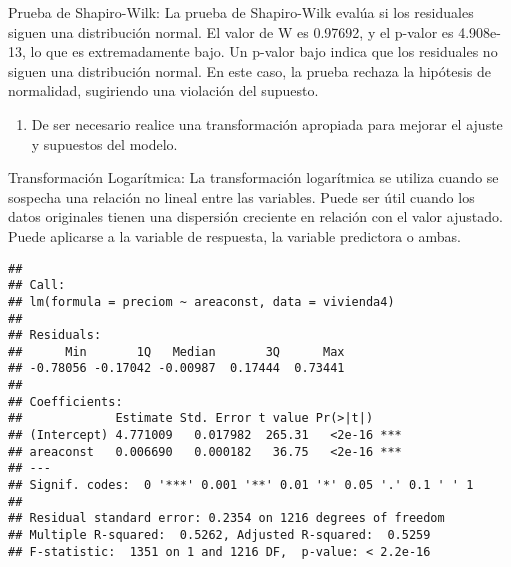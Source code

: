 \documentclass[
]{article}
\newenvironment{Shaded}{\begin{snugshade}}{\end{snugshade}}
\newcommand{\AttributeTok}[1]{\textcolor[rgb]{0.13,0.29,0.53}{#1}}
\newcommand{\CommentTok}[1]{\textcolor[rgb]{0.56,0.35,0.01}{\textit{#1}}}
\newcommand{\FunctionTok}[1]{\textcolor[rgb]{0.13,0.29,0.53}{\textbf{#1}}}
\newcommand{\NormalTok}[1]{#1}
\newcommand{\OtherTok}[1]{\textcolor[rgb]{0.56,0.35,0.01}{#1}}
\newcommand{\SpecialCharTok}[1]{\textcolor[rgb]{0.81,0.36,0.00}{\textbf{#1}}}
\providecommand{\tightlist}{%
  \setlength{\itemsep}{0pt}\setlength{\parskip}{0pt}}
\begin{document}
Prueba de Shapiro-Wilk: La prueba de Shapiro-Wilk evalúa si los
residuales siguen una distribución normal. El valor de W es 0.97692, y
el p-valor es 4.908e-13, lo que es extremadamente bajo. Un p-valor bajo
indica que los residuales no siguen una distribución normal. En este
caso, la prueba rechaza la hipótesis de normalidad, sugiriendo una
violación del supuesto.

\begin{enumerate}
\def\labelenumi{\arabic{enumi}.}
\setcounter{enumi}{7}
\tightlist
\item
  De ser necesario realice una transformación apropiada para mejorar el
  ajuste y supuestos del modelo.
\end{enumerate}

Transformación Logarítmica: La transformación logarítmica se utiliza
cuando se sospecha una relación no lineal entre las variables. Puede ser
útil cuando los datos originales tienen una dispersión creciente en
relación con el valor ajustado. Puede aplicarse a la variable de
respuesta, la variable predictora o ambas.

\begin{Shaded}
\end{Shaded}

\begin{verbatim}
## 
## Call:
## lm(formula = preciom ~ areaconst, data = vivienda4)
## 
## Residuals:
##      Min       1Q   Median       3Q      Max 
## -0.78056 -0.17042 -0.00987  0.17444  0.73441 
## 
## Coefficients:
##             Estimate Std. Error t value Pr(>|t|)    
## (Intercept) 4.771009   0.017982  265.31   <2e-16 ***
## areaconst   0.006690   0.000182   36.75   <2e-16 ***
## ---
## Signif. codes:  0 '***' 0.001 '**' 0.01 '*' 0.05 '.' 0.1 ' ' 1
## 
## Residual standard error: 0.2354 on 1216 degrees of freedom
## Multiple R-squared:  0.5262, Adjusted R-squared:  0.5259 
## F-statistic:  1351 on 1 and 1216 DF,  p-value: < 2.2e-16
\end{verbatim}
\end{document}

